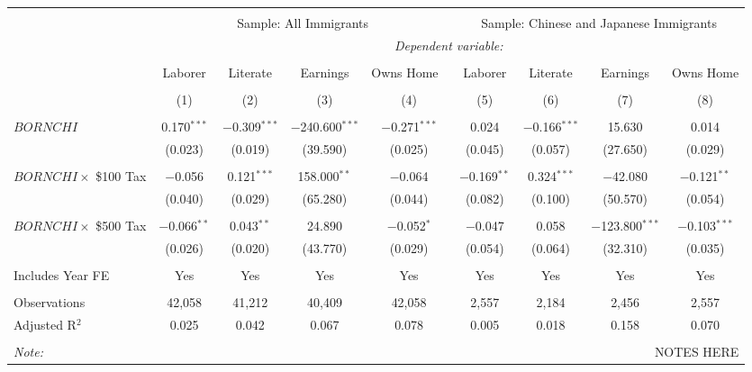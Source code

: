
\begin{tabular}{@{\extracolsep{5pt}}lcccccccc} 
\\[-1.8ex]\hline 
\hline \\[-1.8ex] 
 & \multicolumn{4}{c}{Sample: All Immigrants} & \multicolumn{4}{c}{Sample: Chinese and Japanese Immigrants} \\ 
 & \multicolumn{8}{c}{\textit{Dependent variable:}} \\ 
\cline{2-9} 
\\[-1.8ex] & Laborer & Literate & Earnings & Owns Home \,\, & Laborer & Literate & Earnings & Owns Home \\ 
\\[-1.8ex] & (1) & (2) & (3) & (4) & (5) & (6) & (7) & (8)\\ 
\hline \\[-1.8ex] 
 $BORNCHI$ & 0.170$^{***}$ & $-$0.309$^{***}$ & $-$240.600$^{***}$ & $-$0.271$^{***}$ & 0.024 & $-$0.166$^{***}$ & 15.630 & 0.014 \\ 
  & (0.023) & (0.019) & (39.590) & (0.025) & (0.045) & (0.057) & (27.650) & (0.029) \\ 
  & & & & & & & & \\ 
 $BORNCHI \times$ \$100 Tax & $-$0.056 & 0.121$^{***}$ & 158.000$^{**}$ & $-$0.064 & $-$0.169$^{**}$ & 0.324$^{***}$ & $-$42.080 & $-$0.121$^{**}$ \\ 
  & (0.040) & (0.029) & (65.280) & (0.044) & (0.082) & (0.100) & (50.570) & (0.054) \\ 
  & & & & & & & & \\ 
 $BORNCHI \times$ \$500 Tax & $-$0.066$^{**}$ & 0.043$^{**}$ & 24.890 & $-$0.052$^{*}$ & $-$0.047 & 0.058 & $-$123.800$^{***}$ & $-$0.103$^{***}$ \\ 
  & (0.026) & (0.020) & (43.770) & (0.029) & (0.054) & (0.064) & (32.310) & (0.035) \\ 
  & & & & & & & & \\ 
Includes Year FE & Yes & Yes & Yes & Yes & Yes & Yes & Yes & Yes \\ 
\hline \\[-1.8ex] 
Observations & 42,058 & 41,212 & 40,409 & 42,058 & 2,557 & 2,184 & 2,456 & 2,557 \\ 
Adjusted R$^{2}$ & 0.025 & 0.042 & 0.067 & 0.078 & 0.005 & 0.018 & 0.158 & 0.070 \\ 
\hline \\[-1.8ex] 
\textit{Note:}  & \multicolumn{8}{r}{NOTES HERE} \\ 
\end{tabular} 
